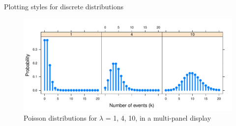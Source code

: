 \documentclass[11pt]{book}
\renewenvironment{knitrout}{\small\renewcommand{\baselinestretch}{.85}}{} %
\begin{document}
\begin{Example}{Plotting styles for discrete distributions}
\begin{knitrout}
\color{fgcolor}\begin{kframe}
\begin{alltt}
 \hlopt{~}  \hlopt{|}  
  \hlstd{=}\hlstd{(}\hlstd{,} \hlstd{),} \hlstd{=}\hlstd{,} \hlstd{=}\hlstd{,} \hlstd{=}\hlstd{,} \hlstd{=}\hlstd{(}\hlstd{,}\hlstd{),}
  \hlstd{=}\hlstd{(}\hlstd{,} \hlstd{=}\hlstd{),}
  \hlstd{=}\hlstd{(}\hlstd{,}  \hlstd{=}\hlstd{))}
\end{alltt}
\end{kframe}\begin{figure}[!htbp]


\centerline{\includegraphics[width=\textwidth]{ch03/fig/dpois-xyplot1} }

\caption[Poisson distributions for $\lambda$ = 1, 4, 10, in a multi-panel display]{Poisson distributions for $\lambda$ = 1, 4, 10, in a multi-panel display\label{fig:dpois-xyplot1}}
\end{figure}


\end{knitrout}


\end{Example}
\end{document}
